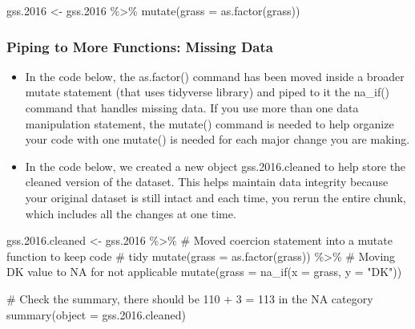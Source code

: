 \documentclass[
  letterpaper,
  DIV=11,
  numbers=noendperiod]{scrreprt}
\newenvironment{Shaded}{\begin{snugshade}}{\end{snugshade}}
\newcommand{\AttributeTok}[1]{\textcolor[rgb]{0.40,0.45,0.13}{#1}}
\newcommand{\CommentTok}[1]{\textcolor[rgb]{0.37,0.37,0.37}{#1}}
\newcommand{\FloatTok}[1]{\textcolor[rgb]{0.68,0.00,0.00}{#1}}
\newcommand{\FunctionTok}[1]{\textcolor[rgb]{0.28,0.35,0.67}{#1}}
\newcommand{\NormalTok}[1]{\textcolor[rgb]{0.00,0.23,0.31}{#1}}
\newcommand{\OtherTok}[1]{\textcolor[rgb]{0.00,0.23,0.31}{#1}}
\newcommand{\SpecialCharTok}[1]{\textcolor[rgb]{0.37,0.37,0.37}{#1}}
\newcommand{\StringTok}[1]{\textcolor[rgb]{0.13,0.47,0.30}{#1}}
\providecommand{\tightlist}{%
  \setlength{\itemsep}{0pt}\setlength{\parskip}{0pt}}\usepackage{longtable,booktabs,array}
\begin{document}
\begin{Shaded}
\begin{Highlighting}[]
\NormalTok{gss}\FloatTok{.2016} \OtherTok{\textless{}{-}}\NormalTok{ gss}\FloatTok{.2016} \SpecialCharTok{\%\textgreater{}\%}
    \FunctionTok{mutate}\NormalTok{(}\AttributeTok{grass =} \FunctionTok{as.factor}\NormalTok{(grass))}
\end{Highlighting}
\end{Shaded}

\subsubsection{Piping to More Functions: Missing
Data}\label{piping-to-more-functions-missing-data}

\begin{itemize}
\tightlist
\item
  In the code below, the as.factor() command has been moved inside a
  broader mutate statement (that uses tidyverse library) and piped to it
  the na\_if() command that handles missing data. If you use more than
  one data manipulation statement, the mutate() command is needed to
  help organize your code with one mutate() is needed for each major
  change you are making.
\item
  In the code below, we created a new object gss.2016.cleaned to help
  store the cleaned version of the dataset. This helps maintain data
  integrity because your original dataset is still intact and each time,
  you rerun the entire chunk, which includes all the changes at one
  time.
\end{itemize}

\begin{Shaded}
\begin{Highlighting}[]
\NormalTok{gss.}\FloatTok{2016.}\NormalTok{cleaned }\OtherTok{\textless{}{-}}\NormalTok{ gss}\FloatTok{.2016} \SpecialCharTok{\%\textgreater{}\%}
    \CommentTok{\# Moved coercion statement into a mutate function to keep code}
    \CommentTok{\# tidy}
\FunctionTok{mutate}\NormalTok{(}\AttributeTok{grass =} \FunctionTok{as.factor}\NormalTok{(grass)) }\SpecialCharTok{\%\textgreater{}\%}
    \CommentTok{\# Moving DK value to NA for not applicable}
\FunctionTok{mutate}\NormalTok{(}\AttributeTok{grass =} \FunctionTok{na\_if}\NormalTok{(}\AttributeTok{x =}\NormalTok{ grass, }\AttributeTok{y =} \StringTok{"DK"}\NormalTok{))}

\CommentTok{\# Check the summary, there should be 110 + 3 = 113 in the NA category}
\FunctionTok{summary}\NormalTok{(}\AttributeTok{object =}\NormalTok{ gss.}\FloatTok{2016.}\NormalTok{cleaned)}
\end{Highlighting}
\end{Shaded}
\end{document}
